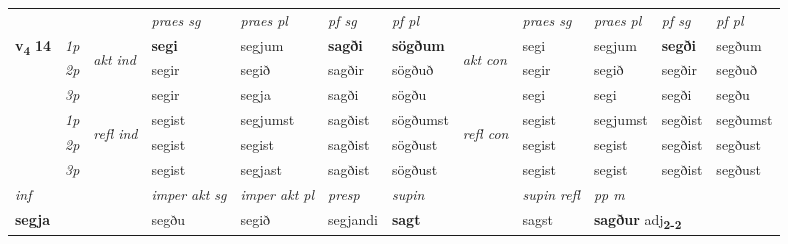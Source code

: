\begin{longtable}[l]{X>{\footnotesize\itshape}llXXXXlXXXX}
 & &   & \textit{praes sg}  & \textit{praes pl}    & \textit{ pf sg} & \textit{pf pl} & & \textit{praes sg}  & \textit{praes pl}    & \textit{pf sg} & \textit{pf pl }  \\ \cmidrule{4-7} \cmidrule{9-12}
 \multirow{2}{*}{{{\textbf{v{\textsubscript{4}}} \Large{\textbf{14}}}}}  & 1p & \multirow{3}{*}{\begin{turn}{90}\textit{akt ind}\end{turn}} & \textbf{segi} & segjum & \textbf{sagði} & \textbf{sögðum} & \multirow{3}{*}{\begin{turn}{90}\textit{akt con}\end{turn}} &segi & segjum & \textbf{segði} & segðum\\*
 & 2p &  &  segir  & segið & sagðir & sögðuð & & segir & segið & segðir & segðuð \\*
 & 3p &  & segir & segja & sagði & sögðu & & segi & segi& segði & segðu \\*
\cmidrule{4-7} \cmidrule{9-12}
 & 1p & \multirow{3}{*}{\begin{turn}{90}\textit{refl ind}\end{turn}}  & segist & segjumst & sagðist & sögðumst & \multirow{3}{*}{\begin{turn}{90}\textit{refl con}\end{turn}}  &segist & segjumst & segðist & segðumst \\*
 & 2p &  & segist & segist & sagðist & sögðust & &segist & segist & segðist & segðust \\*
 & 3p  & & segist & segjast & sagðist & sögðust & & segist & segist& segðist & segðust \\*
\cmidrule{4-7} \cmidrule{9-12}

   {\textit{inf}} & &  & \textit{imper akt sg} & \textit{imper akt pl}   & \textit{presp} & \textit{supin} && \textit{supin refl} & \textit{pp m} \\*
  {\textbf{segja}} & && segðu  & segið   & segjandi &  \textbf{sagt} && sagst & \multicolumn{2}{l}{\textbf{sagður} adj\textbf{\textsubscript{2-2}}} \\*

\midrule


\end{longtable}
